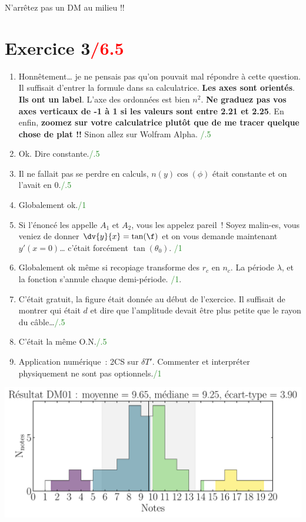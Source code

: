 \documentclass[a4paper, 10pt, final, garamond]{book}
\begin{document}
\begin{center}
    \Huge N'arrêtez pas un DM au milieu !!
\end{center}

\section{Exercice 3\hfill \textcolor{red}{/6.5}}
\begin{enumerate}[start=14]
    \item Honnêtement… je ne pensais pas qu'on pouvait mal répondre à cette
        question. Il suffisait d'entrer la formule dans sa calculatrice.
        \textbf{Les axes sont orientés}. \textbf{Ils ont un label}. L'axe des
        ordonnées est bien $n^2$. \textbf{Ne graduez pas vos axes verticaux de
        -1 à 1 si les valeurs sont entre \num{2.21} et \num{2.25}}. En enfin,
        \textbf{zoomez sur votre calculatrice plutôt que de me tracer quelque
        chose de plat !!} Sinon allez sur Wolfram Alpha.\hfill
        \textcolor{ForestGreen}{/.5}
    \item Ok. Dire constante.\hfill \textcolor{ForestGreen}{/.5}
    \item Il ne fallait pas se perdre en calculs, $n(y)\cos(\phi)$ était
        constante et on l'avait en $0$.\hfill \textcolor{ForestGreen}{/.5}
    \item Globalement ok.\hfill \textcolor{ForestGreen}{/1}
    \item Si l'énoncé les appelle $A_1$ et $A_2$, vous les appelez pareil~!
        Soyez malin-es, vous veniez de donner $\dv{y}{x} = \tan(\f)$ et on vous
        demande maintenant $y'(x=0)$… c'était forcément $\tan(\theta_0)$.\hfill
        \textcolor{ForestGreen}{/1}
    \item Globalement ok même si recopiage transforme des $r_c$ en $n_c$. La
        période $\lambda$, et la fonction s'annule chaque demi-période.\hfill
        \textcolor{ForestGreen}{/1}.
    \item C'était gratuit, la figure était donnée au début de l'exercice. Il
        suffisait de montrer qui était $d$ et dire que l'amplitude devait être
        plus petite que le rayon du câble…\hfill \textcolor{ForestGreen}{/.5}
    \item C'était la même O.N.\hfill \textcolor{ForestGreen}{/.5}
    \item Application numérique~: 2CS sur $\delta T'$. Commenter et interpréter
        physiquement ne sont pas optionnels.\hfill \textcolor{ForestGreen}{/1}
\end{enumerate}

\vfill

\begin{center}
    \includegraphics[width=\linewidth]{res_dm01.pdf}
\end{center}

\vfill
\end{document}
